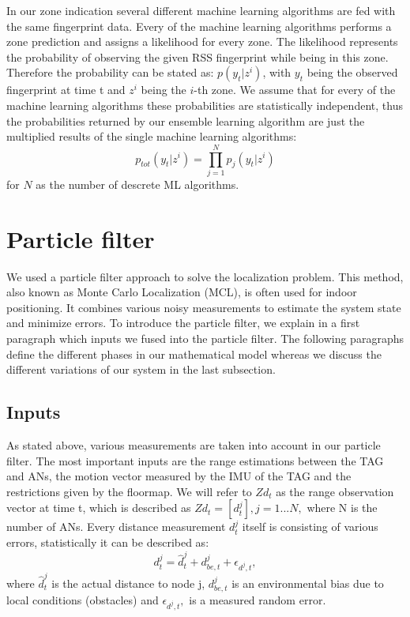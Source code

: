 In our zone indication several different machine learning algorithms are fed with the same fingerprint data. Every of the machine learning algorithms performs a zone prediction and assigns a likelihood for every zone. The likelihood represents the probability of observing the given RSS fingerprint while being in this zone. Therefore the probability can be stated as: $p(y_{t} | z^{i})$, with $y_{t}$ being the observed fingerprint at time t and $z^{i}$ being the $i$-th zone. We assume that for every of the machine learning algorithms these probabilities are statistically independent, thus the probabilities returned by our ensemble learning algorithm are just the multiplied results of the single machine learning algorithms: $$ p_{tot}(y_{t} | z^{i})=  \prod_{j=1}^{N} p_{j}(y_{t} | z^{i})$$ for $N$ as the number of descrete ML algorithms.





\section{Particle filter}
We used a particle filter approach to solve the localization problem. This method, also known as Monte Carlo Localization (MCL), is often used for indoor positioning. It combines various noisy measurements to estimate the system state and minimize errors. To introduce the particle filter, we explain in a first paragraph which inputs we fused into the particle filter. The following paragraphs define the different phases in our mathematical model whereas we discuss the different variations of our system in the last subsection.

\subsection{Inputs}
As stated above, various measurements are taken into account in our particle filter. The most important inputs are the range estimations between the TAG and ANs, the motion vector measured by the IMU of the TAG and the restrictions given by the floormap. We will refer to $Zd_{t}$ as the range observation vector at time t, which is described as $Zd_{t} = [d^{j}_{t}], j = 1...N,$ where N is the number of ANs. Every distance measurement $d^{j}_{t}$ itself is consisting of various errors, statistically it can be described as: 
$$d^{j}_{t} = \hat{d}^{j}_{t} + d^{j}_{be, t} + \epsilon_{d^{j}, t},$$
where $\hat{d}^{j}_{t}$ is the actual distance to node j, $d^{j}_{be, t}$ is an environmental bias due to local conditions (obstacles) and $\epsilon_{d^{j}, t},$ is a measured random error.

